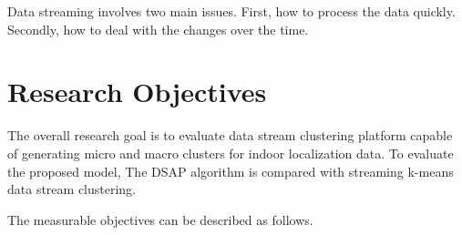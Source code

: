 Data streaming involves two main issues. First, how to process the data quickly.
Secondly, how to deal with the changes over the time.











\section{Research Objectives}

The overall research goal is to evaluate data stream clustering platform capable of generating micro and macro clusters for indoor localization data. To evaluate the proposed model, The DSAP algorithm is compared with streaming k-means data stream clustering.

The measurable objectives can be described as follows. 

